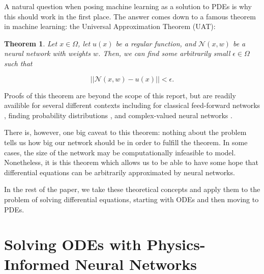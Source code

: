 \documentclass{CUP-JNL-DTM}%
\newtheorem{theorem}{Theorem}[section]
\theoremstyle{definition}
\numberwithin{equation}{section}
\newcommand{\net}{\mathcal{N}}
\begin{document}
A natural question when posing machine learning as a solution to PDEs is why this should work in the first place. The answer comes down to a famous theorem in machine learning: the Universal Approximation Theorem (UAT):

\begin{theorem}

Let $x \in \Omega$, let $u(x)$ be a regular function, and $\net(x,w)$ be a neural network with weights $w$. Then, we can find some arbitrarily small $\epsilon \in \Omega$ such that 

\begin{equation}
	||\net(x,w) - u(x)|| < \epsilon. 
\end{equation}

\end{theorem}

\noindent Proofs of this theorem are beyond the scope of this report, but are readily availible for several different contexts including for classical feed-forward networks \cite{hornikMultilayerFeedforwardNetworks1989, hornikApproximationCapabilitiesMultilayer1991}, finding probability distributions \cite{luUniversalApproximationTheorem2020}, and complex-valued neural networks \cite{voigtlaenderUniversalApproximationTheorem2020}. 

There is, however, one big caveat to this theorem: nothing about the problem tells us how big our network should be in order to fulfill the theorem. In some cases, the size of the network may be computationally infeasible to model. Nonetheless, it is this theorem which allows us to be able to have some hope that differential equations can be arbitrarily approximated by neural networks. 

In the rest of the paper, we take these theoretical concepts and apply them to the problem of solving differential equations, starting with ODEs and then moving to PDEs. 



\section{Solving ODEs with Physics-Informed Neural Networks}
\end{document}
